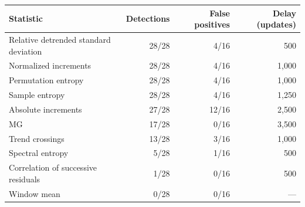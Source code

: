 \begin{tabular}{lrrr}
\toprule
Statistic & Detections & False positives & Delay (updates) \\
\midrule
Relative detrended standard deviation & 28/28 & 4/16 & 500 \\
Normalized increments & 28/28 & 4/16 & 1,000 \\
Permutation entropy & 28/28 & 4/16 & 1,000 \\
Sample entropy & 28/28 & 4/16 & 1,250 \\
Absolute increments & 27/28 & 12/16 & 2,500 \\
MG & 17/28 & 0/16 & 3,500 \\
Trend crossings & 13/28 & 3/16 & 1,000 \\
Spectral entropy & 5/28 & 1/16 & 500 \\
Correlation of successive residuals & 1/28 & 0/16 & 500 \\
Window mean & 0/28 & 0/16 & --- \\
\bottomrule
\end{tabular}
